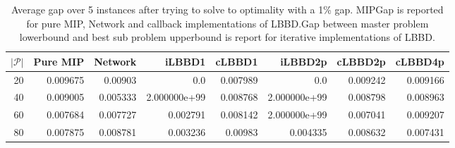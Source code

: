 \begin{table*}
    \centering
    \caption{Average gap over 5 instances after trying to solve to optimality with a 1\% gap. MIPGap is reported for pure MIP, Network and callback implementations of LBBD.\@ Gap between master problem lowerbound and best sub problem upperbound is report for iterative implementations of LBBD.}
    \begin{tabular}{rrrrrrrr} \toprule
        $|\mathcal{P}|$ & Pure MIP & Network & iLBBD1 & cLBBD1 & iLBBD2p & cLBBD2p & cLBBD4p \\ \midrule
        20 & 0.009675&  0.00903&     0.0 & 0.007989&      0.0 & 0.009242 & 0.009166 \\
        40&  0.009005&  0.005333&  2.000000e+99&  0.008768&  2.000000e+99&  0.008798&  0.008963 \\
        60&  0.007684&  0.007727&  0.002791&  0.008142&  2.000000e+99&  0.007041&  0.009207\\
        80&  0.007875&  0.008781&  0.003236&  0.00983 & 0.004335&  0.008632&  0.007431\\
        \bottomrule
    \end{tabular}
\end{table*}
